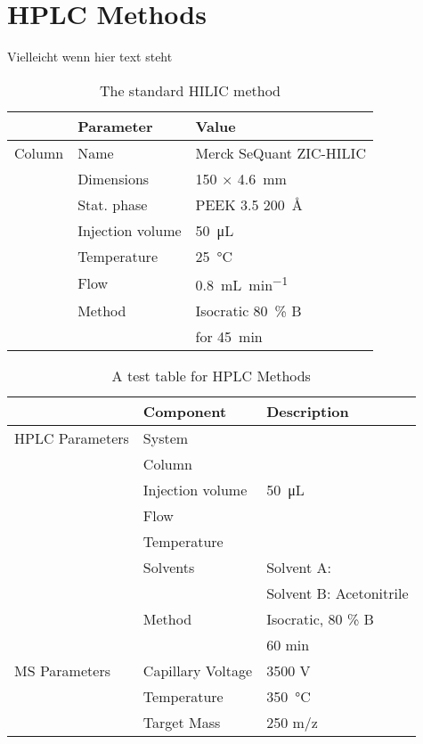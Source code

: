 
\section{HPLC Methods} %
\label{sec:hplc_methods}
	Vielleicht wenn hier text steht
	\begin{table}[htbp]
		\caption{The standard HILIC method}
		\label{tab:hilic_standard}
		\centering
		\begin{tabularx}{\textwidth}{XXX}
			\toprule
						& 	\textbf{Parameter}	& \textbf{Value}	\\
			\midrule
			Column		& Name			& Merck SeQuant\textsuperscript{\textregistered} ZIC\textsuperscript{\textregistered}-HILIC 	\\
						& Dimensions	& 150 $\times$ \SI{4.6}{\milli\meter}	\\
						& Stat. phase	& PEEK \SI{3.5}{\micrometre} \SI{200}{\angstrom} \\
						& Injection volume& \SI{50}{\micro\liter}	\\
						& Temperature	& \SI{25}{\celsius}		\\
						& Flow			& \SI{0.8}{\milli\liter\per\minute}	\\
						& Method 		& Isocratic \SI{80}{\percent} B	\\
						&				& for \SI{45}{\minute}			\\

			\bottomrule
		\end{tabularx}
	\end{table}

\begin{table}[h]
	\caption{A test table for HPLC Methods}
	\label{tab:asddf}
	\centering
	\begin{tabularx}{\textwidth}{XXX}
						& \textbf{Component}		& \textbf{Description}	\\
		\midrule
		HPLC Parameters & System			& 	\\
						& Column			& 	\\
						& Injection volume 	& \SI{50}{\micro\liter}	\\
						& Flow				& 	\\
						& Temperature		& 	\\
						& Solvents			& Solvent A: \ch{H2O}	\\
						& 					& Solvent B: Acetonitrile	\\
						& Method			& Isocratic, 80 \% B \\
						&					& 60 min \\
		MS Parameters	& Capillary Voltage	& 3500 V\\
						& Temperature		& \SI{350}{\celsius}	\\
						& Target Mass		& 250 m/z \\
		\bottomrule
	\end{tabularx}
\end{table}

